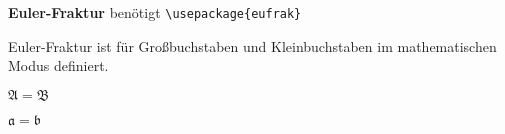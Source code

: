 \documentclass[a5paper]{article}
\begin{document}
\textbf{Euler-Fraktur} benötigt \texttt{\textbackslash usepackage\{eufrak\}}

Euler-Fraktur ist für Großbuchstaben und Kleinbuchstaben 
im mathematischen Modus definiert.

\begin{example}
$\mathfrak{A} = \mathfrak{B}$
\end{example}

\begin{example}
$\mathfrak{a} = \mathfrak{b}$
\end{example}
\end{document}
